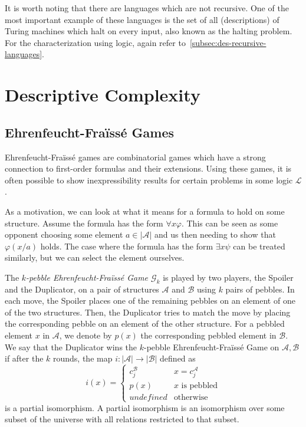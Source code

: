 It is worth noting that there are languages which are not recursive.
One of the most important example of these languages is the set of all (descriptions) of Turing machines which halt on every input, also known as the halting problem.
For the characterization using logic, again refer to~\cref{subsec:des-recursive-languages}.

\section{Descriptive Complexity}\label{sec:descriptive-complexity-context}

\subsection{Ehrenfeucht-Fraïssé Games}\label{subsec:ehrenfeucht-fraisse-games}

Ehrenfeucht-Fraïssé games are combinatorial games which have a strong connection to first-order formulas and their extensions.
Using these games, it is often possible to show inexpressibility results for certain problems in some logic $\mathcal{L}$.

As a motivation, we can look at what it means for a formula to hold on some structure.
Assume the formula has the form $\forall x\varphi$.
This can be seen as some opponent choosing some element $a \in |\mathcal{A}|$ and us then needing to show that $\varphi(x / a)$ holds.
The case where the formula has the form $\exists x\psi$ can be treated similarly, but we can select the element ourselves.

\begin{define}
    The \emph{$k$-pebble Ehrenfeucht-Fraïssé Game $\mathcal{G}_k$} is played by two players, the Spoiler and the Duplicator, on a pair of structures $\mathcal{A}$ and $\mathcal{B}$ using $k$ pairs of pebbles.
    In each move, the Spoiler places one of the remaining pebbles on an element of one of the two structures.
    Then, the Duplicator tries to match the move by placing the corresponding pebble on an element of the other structure.
    For a pebbled element $x$ in $\mathcal{A}$, we denote by $p(x)$ the corresponding pebbled element in $\mathcal{B}$.
    We say that the Duplicator wins the $k$-pebble Ehrenfeucht-Fraïssé Game on $\mathcal{A}, \mathcal{B}$ if after the $k$ rounds, the map $i : |\mathcal{A}| \to |\mathcal{B}|$ defined as
    \[
        i(x) = \begin{cases}
                   c_{j}^{\mathcal{B}} & x = c_{j}^{\mathcal{A}} \\
                   p(x) & x\text{ is pebbled}\\
                   undefined & \text{otherwise}
        \end{cases}
    \]
    is a partial isomorphism.
    A partial isomorphism is an isomorphism over some subset of the universe with all relations restricted to that subset.
\end{define}

